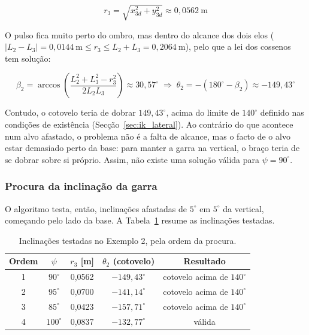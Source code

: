 \begin{equation}
    r_3=\sqrt{x_{3d}^2+y_{3d}^2}\approx0{,}0562\ \text{m}
\end{equation}

O pulso fica muito perto do ombro, mas dentro do alcance dos dois elos ($|L_2-L_3|=0{,}0144\ \text{m}\le r_3\le L_2+L_3=0{,}2064\ \text{m}$), pelo que a lei dos cossenos tem solução:

\begin{equation}
    \beta_2=\arccos\!\left(\frac{L_2^2+L_3^2-r_3^2}{2L_2L_3}\right)\approx30{,}57^\circ
    \;\Rightarrow\;
    \theta_2=-(180^\circ-\beta_2)\approx-149{,}43^\circ
\end{equation}

Contudo, o cotovelo teria de dobrar $149{,}43^\circ$, acima do limite de $140^\circ$ definido nas condições de existência (Secção~\ref{sec:ik_lateral}). Ao contrário do que acontece num alvo afastado, o problema não é a falta de alcance, mas o facto de o alvo estar demasiado perto da base: para manter a garra na vertical, o braço teria de se dobrar sobre si próprio. Assim, não existe uma solução válida para $\psi=90^\circ$.

\subsubsection*{Procura da inclinação da garra}

O algoritmo testa, então, inclinações afastadas de $5^\circ$ em $5^\circ$ da vertical, começando pelo lado da base. A Tabela~\ref{tab:ex2_procura} resume as inclinações testadas.

\begin{table}[H]
    \centering
    \caption{Inclinações testadas no Exemplo 2, pela ordem da procura.}
    \label{tab:ex2_procura}
    \begin{tabular}{ccccc}
        \toprule
        Ordem & $\psi$ & $r_3$ [m] & $\theta_2$ (cotovelo) & Resultado \\
        \midrule
        1 & $90^\circ$  & 0,0562 & $-149{,}43^\circ$ & cotovelo acima de $140^\circ$ \\
        2 & $95^\circ$  & 0,0700 & $-141{,}14^\circ$ & cotovelo acima de $140^\circ$ \\
        3 & $85^\circ$  & 0,0423 & $-157{,}71^\circ$ & cotovelo acima de $140^\circ$ \\
        4 & $100^\circ$ & 0,0837 & $-132{,}77^\circ$ & válida \\
        \bottomrule
    \end{tabular}
\end{table}

